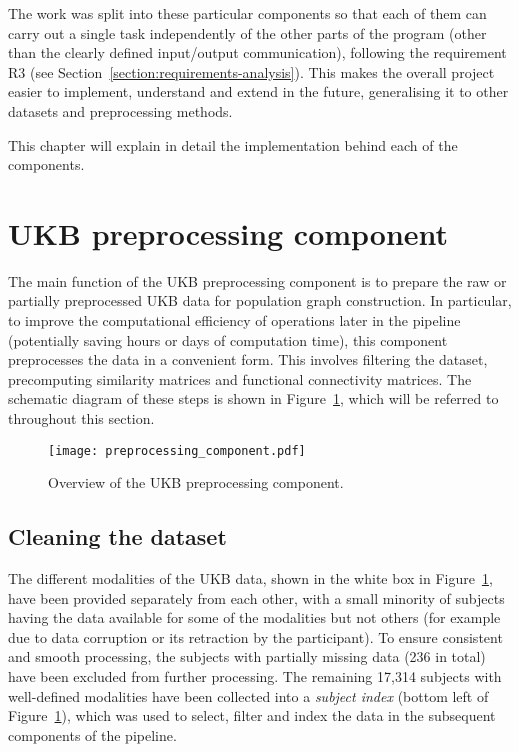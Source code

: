 The work was split into these particular components so that each of them can carry out a single task independently of the other parts of the program (other than the clearly defined input/output communication), following the requirement R3 (see Section~\ref{section:requirements-analysis}). This makes the overall project easier to implement, understand and extend in the future, generalising it to other datasets and preprocessing methods. 

This chapter will explain in detail the implementation behind each of the components.

\section{UKB preprocessing component}
\label{section:ukb-preprocessing}

The main function of the UKB preprocessing component is to prepare the raw or partially preprocessed UKB data for population graph construction. In particular, to improve the computational efficiency of operations later in the pipeline (potentially saving hours or days of computation time), this component preprocesses the data in a convenient form. This involves filtering the dataset, precomputing similarity matrices and functional connectivity matrices. The schematic diagram of these steps is shown in Figure~\ref{preprocessing-component}, which will be referred to throughout this section.

\begin{figure}[h]
    \centering
    \texttt{[image: preprocessing\_component.pdf]}
    \caption{Overview of the UKB preprocessing component.}\label{preprocessing-component}
\end{figure}

\subsection{Cleaning the dataset}
The different modalities of the UKB data, shown in the white box in Figure~\ref{preprocessing-component}, have been provided separately from each other, with a small minority of subjects having the data available for some of the modalities but not others (for example due to data corruption or its retraction by the participant). To ensure consistent and smooth processing, the subjects with partially missing data (236 in total) have been excluded from further processing. The remaining 17,314 subjects with well-defined modalities have been collected into a \textit{subject index} (bottom left of Figure~\ref{preprocessing-component}), which was used to select, filter and index the data in the subsequent components of the pipeline.

